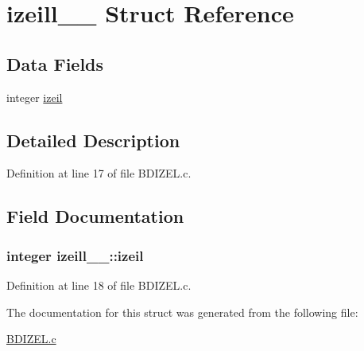 \hypertarget{structizeill__1__}{}\section{izeill\+\_\+\_\+ Struct Reference}
\label{structizeill__1__}
\subsection*{Data Fields}
\begin{DoxyCompactItemize}
\item 
integer \hyperlink{structizeill__1___a48ab41d2ca5f869e71d774cf53e86ac7}{izeil}
\end{DoxyCompactItemize}


\subsection{Detailed Description}


Definition at line 17 of file B\+D\+I\+Z\+E\+L.\+c.



\subsection{Field Documentation}
\subsubsection[{\texorpdfstring{izeil}{izeil}}]{\setlength{\rightskip}{0pt plus 5cm}integer izeill\+\_\+\_\+\+::izeil}\hypertarget{structizeill__1___a48ab41d2ca5f869e71d774cf53e86ac7}{}\label{structizeill__1___a48ab41d2ca5f869e71d774cf53e86ac7}


Definition at line 18 of file B\+D\+I\+Z\+E\+L.\+c.



The documentation for this struct was generated from the following file\+:\begin{DoxyCompactItemize}
\item 
\hyperlink{BDIZEL_8c}{B\+D\+I\+Z\+E\+L.\+c}\end{DoxyCompactItemize}
